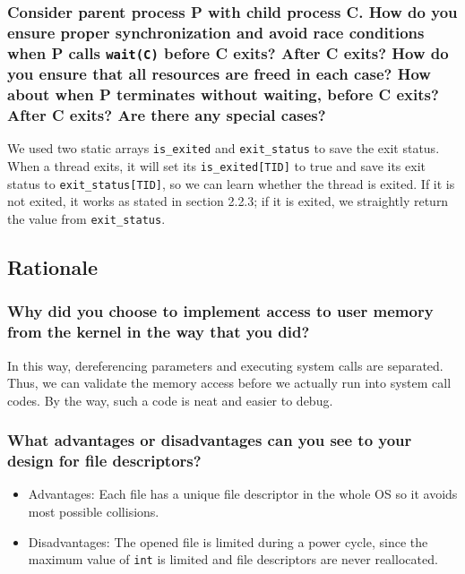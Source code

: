 \documentclass[sigconf, nonacm, balance=false, urlbreakonhyphens=true]{acmart}
\begin{document}
            \subsubsection{Consider parent process P with child process C.  How do you ensure proper synchronization and avoid race conditions when P calls \texttt{wait(C)} before C exits?  After C exits?  How do you ensure that all resources are freed in each case?  How about when P terminates without waiting, before C exits?  After C exits?  Are there any special cases? }
            
            We used two static arrays \texttt{is\_exited} and \texttt{exit\_status} to save the exit status. When a thread exits, it will set its \texttt{is\_exited[TID]} to true and save its exit status to \texttt{exit\_status[TID]}, so we can learn whether the thread is exited. If it is not exited, it works as stated in section 2.2.3; if it is exited, we straightly return the value from \texttt{exit\_status}. 

        \subsection{Rationale}

            \subsubsection{Why did you choose to implement access to user memory from the kernel in the way that you did? }
            
            In this way, dereferencing parameters and executing system calls are separated. Thus, we can validate the memory access before we actually run into system call codes. By the way, such a code is neat and easier to debug. 

            \subsubsection{What advantages or disadvantages can you see to your design for file descriptors? }
            
            \begin{itemize}
                \item Advantages: Each file has a unique file descriptor in the whole OS so it avoids most possible collisions. 
                \item Disadvantages: The opened file is limited during a power cycle, since the maximum value of \texttt{int} is limited and file descriptors are never reallocated. 
            \end{itemize}
\end{document}
